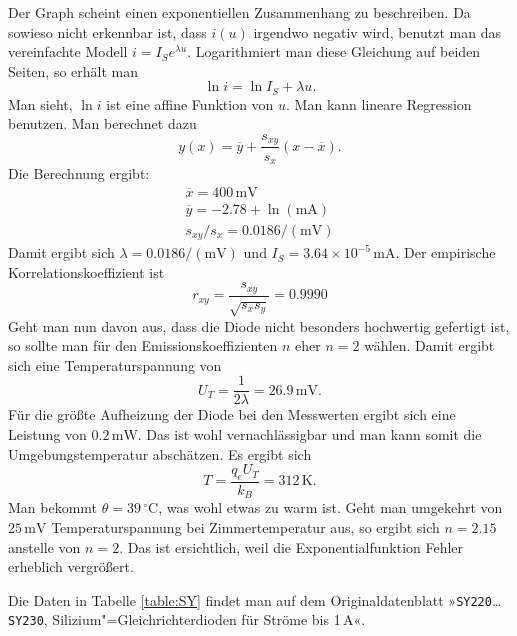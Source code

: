 \documentclass[a4paper,10pt,fleqn,twocolumn,twoside,dvipdfmx]{scrartcl}
\numberwithin{equation}{section}
\begin{document}
\noindent
Der Graph scheint einen exponentiellen Zusammenhang zu
beschreiben. Da sowieso nicht erkennbar ist, dass $i(u)$ irgendwo
negativ wird, benutzt man das vereinfachte Modell
$i=I_Se^{\lambda u}$. Logarithmiert man diese Gleichung auf
beiden Seiten, so erhält man%
\begin{equation}
\ln i = \ln I_S + \lambda u.
\end{equation}
Man sieht, $\ln i$ ist eine affine Funktion von $u$. Man kann lineare
Regression benutzen. Man berechnet dazu%
\begin{equation}
y(x) = \overline y+\frac{s_{xy}}{s_x}(x-\overline x).
\end{equation}
Die Berechnung ergibt:
\begin{gather*}
\overline x = 400\,\mathrm{mV}\\
\overline y = -2.78+\ln(\mathrm{mA})\\
s_{xy}/s_x = 0.0186/(\mathrm{mV})
\end{gather*}
Damit ergibt sich $\lambda = 0.0186/(\mathrm{mV})$ und
$I_S=3.64\times 10^{-5}\,\mathrm{mA}$.
Der empirische Korrelationskoeffizient ist%
\begin{equation}
r_{xy} = \frac{s_{xy}}{\sqrt{s_x s_y}} = 0.9990
\end{equation}
Geht man nun davon aus, dass die Diode nicht besonders hochwertig
gefertigt ist, so sollte man für den Emissionskoeffizienten $n$
eher $n=2$ wählen. Damit ergibt sich eine Temperaturspannung von%
\begin{equation}
U_T = \frac{1}{2\lambda} = 26.9\,\mathrm{mV}.
\end{equation}
Für die größte Aufheizung der Diode bei den Messwerten ergibt
sich eine Leistung von $0.2\,\mathrm{mW}$. Das ist wohl
vernachlässigbar und man kann somit die Umgebungstemperatur
abschätzen. Es ergibt sich%
\begin{equation}
T = \frac{q_e U_T}{k_B} = 312\,\mathrm{K}.
\end{equation}
Man bekommt $\theta = 39\,\mathrm{{}^\circ C}$, was wohl etwas
zu warm ist. Geht man umgekehrt von $25\,\mathrm{mV}$
Temperaturspannung bei Zimmertemperatur aus, so ergibt
sich $n=2.15$ anstelle von $n=2$. Das ist ersichtlich, weil
die Exponentialfunktion Fehler erheblich vergrößert.

Die Daten in Tabelle \ref{table:SY} findet man auf dem
Originaldatenblatt »\texttt{SY220}{\ldots}\texttt{SY230},
Silizium"=Gleichrichterdioden für Ströme bis 1\,A«.
\end{document}
